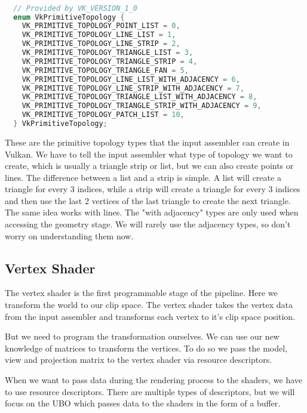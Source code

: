 \documentclass[12pt]{report} \usepackage{preamble}
\begin{document}
\newpage

\begin{lstlisting}[language=C++] 

  // Provided by VK_VERSION_1_0
  enum VkPrimitiveTopology {
    VK_PRIMITIVE_TOPOLOGY_POINT_LIST = 0,
    VK_PRIMITIVE_TOPOLOGY_LINE_LIST = 1,
    VK_PRIMITIVE_TOPOLOGY_LINE_STRIP = 2,
    VK_PRIMITIVE_TOPOLOGY_TRIANGLE_LIST = 3,
    VK_PRIMITIVE_TOPOLOGY_TRIANGLE_STRIP = 4,
    VK_PRIMITIVE_TOPOLOGY_TRIANGLE_FAN = 5,
    VK_PRIMITIVE_TOPOLOGY_LINE_LIST_WITH_ADJACENCY = 6,
    VK_PRIMITIVE_TOPOLOGY_LINE_STRIP_WITH_ADJACENCY = 7,
    VK_PRIMITIVE_TOPOLOGY_TRIANGLE_LIST_WITH_ADJACENCY = 8,
    VK_PRIMITIVE_TOPOLOGY_TRIANGLE_STRIP_WITH_ADJACENCY = 9,
    VK_PRIMITIVE_TOPOLOGY_PATCH_LIST = 10,
  } VkPrimitiveTopology; 
  \end{lstlisting} \cite{vulkan-spec-primitive-topology}

These are the primitive topology types that the input assembler can
create in Vulkan.  We have to tell the input assembler what type of
topology we want to create, which is usually a triangle strip or list,
but we can also create points or lines.  The difference between a list
and a strip is simple. A list will create a triangle for every 3 indices,
while a strip will create a triangle for every 3 indices and then use
the last 2 vertices of the last triangle to create the next triangle.
The same idea works with lines. The "with adjacency" types are only
used when accessing the geometry stage. We will rarely use
the adjacency types, so don't worry on understanding them now. \cite{vulkan-spec-primitive-topology}

\subsection{Vertex Shader}

The vertex shader is the first programmable stage of the pipeline.
Here we transform the world to our clip space. The vertex shader takes
the vertex data from the input assembler and transforms each vertex
to it's clip space position. \cite{vulkan-tutorial-shader-modules}

But we need to program the transformation ourselves. We can use our new
knowledge of matrices to transform the vertices. To do so we pass the
model, view and projection matrix to the vertex shader via resource descriptors.

When we want to pass data during the rendering process to the shaders,
we have to use resource descriptors. There are multiple types of descriptors, but we will
focus on the \ac{UBO} which passes data to the shaders
in the form of a buffer.
\end{document}
